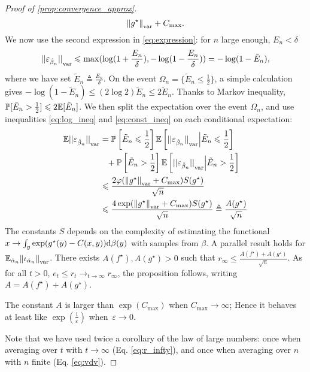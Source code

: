 \begin{proof}[Proof of \autoref{prop:convergence_approx}]
\begin{equation}
    {\Vert g^\star \Vert}_{\text{\upshape var}} + C_{\max}.
\end{equation}
 We now use the second expression in \eqref{eq:expression}: for $n$ large enough, $E_n < \delta$
\begin{equation}\label{eq:log_ineq}
    {|| \varepsilon_{\hat \beta_n} ||}_{\text{\upshape var}} \leqslant \max ( \log(1 + \frac{E_n}{\delta}),
     - \log(1 - \frac{E_n}{\delta}) ) = 
    - \log(1 - \tilde E_n),
\end{equation}
where we have set $\tilde E_n \triangleq \frac{E_n}{\delta}$. On the event
$\Omega_n = \{\tilde E_n \leq \frac{1}{2}\}$, a simple calculation gives $- \log(1
- \tilde E_n) \leq (2 \log 2) \tilde E_n \leq 2 \tilde E_n$. Thanks to Markov inequality,
$\mathbb{P}[\tilde E_n > \frac{1}{2}] \leqslant 2 \mathbb{E}[\tilde E_n]$. We then split the
expectation over the event $\Omega_n$, and use inequalities \eqref{eq:log_ineq}
and \eqref{eq:const_ineq} on each conditional expectation:
\begin{align}\label{eq:vdv}
    \mathbb{E} {|| \varepsilon_{\hat \beta_n} ||}_{\text{\upshape var}}  &= \mathbb{P}\left[\tilde E_n \leqslant \frac{1}{2}\right] 
    \mathbb{E} \left[ {|| \varepsilon_{\hat \beta_n} ||}_{\text{\upshape var}}
    \Big| \tilde E_n \leqslant \frac{1}{2}\right] 
    \\
    &\phantom{=}
    + \mathbb{P}\left[\tilde E_n > \frac{1}{2}\right]      \mathbb{E} \left[ {|| \varepsilon_{\hat \beta_n} ||}_{\text{\upshape var}}
    \Big| \tilde E_n > \frac{1}{2}\right] \\
    &\leqslant \frac{2 \varphi({\Vert g^\star \Vert}_{\text{\upshape var}} + C_{\max}) 
    S(g^\star)}{\sqrt{n}}\\
    &\leqslant \frac{4 \exp({\Vert g^\star \Vert}_{\text{\upshape var}} + C_{\max}) 
    S(g^\star)}{\sqrt{n}} \triangleq \frac{A(g^\star)}{\sqrt{n}}
\end{align}
The constants $S$ depends on the complexity of estimating
the functional $x \to \int_y \exp(g^\star(y) - C(x,y)) \textrm{d} \beta(y)$ with samples from $\beta$.
A parallel
result holds for $\mathbb{E}_{\hat \alpha_n} {\Vert \iota_{\hat \alpha_n}
\Vert}_{\text{\upshape var}}$. There exists $A(f^\star), A(g^\star) > 0$ such that $r_\infty \leq
\frac{A(f^\star) + A(g^\star)}{\sqrt{n}}$. As for all $t >0$, $e_t \leq r_t \to_{t \to \infty}
r_\infty$, the proposition follows,  writing $A = A(f^\star) + A(g^\star)$.

The constant $A$ is larger than $\exp(C_{\max})$ when $C_{\max} \to
\infty$; Hence it behaves at least like $\exp(\frac{1}{\varepsilon})$ when~$\varepsilon
\to 0$.

Note that we have used twice a corollary of the law of large numbers: once when
averaging over $t$ with $t \to \infty$ (Eq. \eqref{eq:r_infty}), and once when
averaging over $n$ with $n$ finite (Eq. \eqref{eq:vdv}).
\end{proof}

